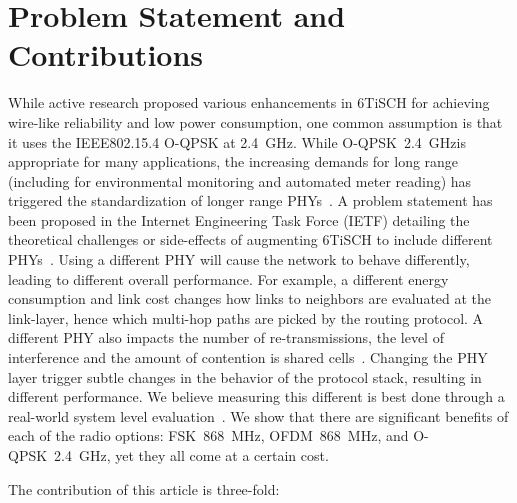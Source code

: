 \documentclass[sensors,article,submit,moreauthors,pdftex]{Definitions/mdpi}
\newcommand{\fsk}           {FSK~868~MHz}
\newcommand{\oqpsk}         {O-QPSK~2.4~GHz}
\newcommand{\ofdm}          {OFDM~868~MHz}
\begin{document}
\section{Problem Statement and Contributions}
\label{sec:contributions}


While active research proposed various enhancements in 6TiSCH  for achieving wire-like reliability and low power consumption,
    one common assumption is that it uses the IEEE802.15.4 O-QPSK at 2.4~GHz.
While \oqpsk is appropriate for many applications,
   the increasing demands for long range (including for environmental monitoring and automated meter reading) has triggered the standardization of longer range PHYs~\cite{munoz18evaluation}.
A problem statement has been proposed in the Internet Engineering Task Force (IETF) detailing the theoretical challenges or side-effects of augmenting 6TiSCH to include different PHYs~\cite{draft-munoz-6tisch-multi-phy-nodes}. 
Using a different PHY will cause the network to behave differently, leading to different overall performance.
For example, a different energy consumption and link cost changes how links to neighbors are evaluated at the link-layer,
    hence which multi-hop paths are picked by the routing protocol.
A different PHY also impacts
    the number of re-transmissions,
    the level of interference and
    the amount of contention is shared cells~\cite{kim15hybrid}.
Changing the PHY layer trigger subtle changes in the behavior of the protocol stack,
    resulting in different performance.
We believe measuring this different is best done through a real-world system level evaluation~\cite{saltzer84endtoend}.
We show that there are significant benefits of each of the radio options: \fsk, \ofdm, and \oqpsk, yet they all come at a certain cost.


The contribution of this article is three-fold:
\end{document}

